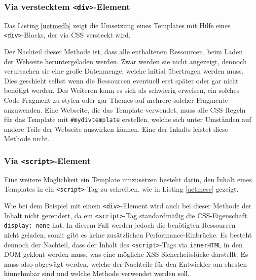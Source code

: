 \subsubsection{Via verstecktem \texttt{\textless{}div\textgreater{}}-Element}

Das Listing \ref{uetmedb} zeigt die Umsetzung eines Templates mit Hilfe eines \texttt{\textless{}div\textgreater{}}-Blocks, der via \ac{CSS} versteckt wird.



Der Nachteil dieser Methode ist, dass alle enthaltenen Ressourcen, beim Laden der Webseite heruntergeladen werden. Zwar werden sie nicht angezeigt, dennoch verursachen sie eine große Datenmenge, welche initial übertragen werden muss. Dies geschieht selbst wenn die Ressourcen eventuell erst später oder gar nicht benötigt werden. Des Weiteren kann es sich als schwierig erweisen, ein solches Code-Fragment zu stylen oder gar Themes auf mehrere solcher Fragmente anzuwenden. Eine Webseite, die das Template verwendet, muss alle \ac{CSS}-Regeln für das Template mit \texttt{\#mydivtemplate} erstellen, welche sich unter Umständen auf andere Teile der Webseite auswirken können. Eine der Inhalts leistet diese Methode nicht.

\subsubsection{Via \texttt{\textless{}script\textgreater{}}-Element}

Eine weitere Möglichkeit ein Template umzusetzen besteht darin, den Inhalt eines Templates in ein \texttt{\textless{}script\textgreater{}}-Tag zu schreiben, wie in Listing \ref{uetmese} gezeigt.



Wie bei dem Beispiel mit einem \texttt{\textless{}div\textgreater{}}-Element wird auch bei dieser Methode der Inhalt nicht gerendert, da ein \texttt{\textless{}script\textgreater{}}-Tag standardmäßig die \ac{CSS}-Eigenschaft \texttt{display:\ none} hat. In diesem Fall werden jedoch die benötigten Ressourcen nicht geladen, somit gibt es keine zusätzlichen Performance-Einbrüche. Es besteht dennoch der Nachteil, dass der Inhalt des \texttt{\textless{}script\textgreater{}}-Tags via \texttt{innerHTML} in den \ac{DOM} geklont werden muss, was eine mögliche \ac{XSS} Sicherheitslücke darstellt. Es muss also abgewägt werden, welche der Nachteile für den Entwickler am ehesten hinnehmbar sind und welche Methode verwendet werden soll.


